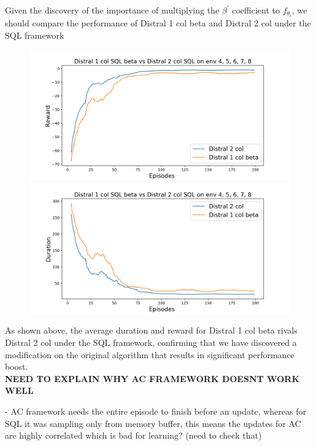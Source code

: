 \documentclass[12pt]{report}
\begin{document}
Given the discovery of the importance of multiplying the $\beta^\prime$ coefficient to $f_{\theta_i}$, we should compare the performance of Distral 1 col beta and Distral 2 col under the SQL framework
\begin{figure}[H]
\centering
\begin{minipage}{.5\textwidth}
\centering
\includegraphics[width=\textwidth]{figs/betas/d1_b_d2_SQL_avg_rwd.png}
\end{minipage}%
\centering
\begin{minipage}{.5\textwidth}
\centering
\includegraphics[width=\textwidth]{figs/betas/d1_b_d2_SQL_avg_dur.png}
\end{minipage}%
\end{figure}
As shown above, the average duration and reward for Distral 1 col beta rivals Distral 2 col under the SQL framework, confirming that we have discovered a modification on the original algorithm that results in significant performance boost.\\

\textbf{NEED TO EXPLAIN WHY AC FRAMEWORK DOESNT WORK WELL}

- AC framework needs the entire episode to finish before an update, whereas for SQL it was sampling only from memory buffer, this means the updates for AC are highly correlated which is bad for learning? (need to check that)\\
\end{document}
